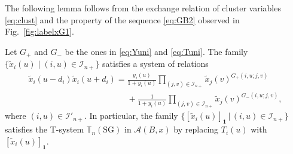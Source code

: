 The following lemma follows from the exchange relation
of
cluster variables \eqref{eq:clust}
and the property of the sequence \eqref{eq:GB2}
 observed in Fig.~\ref{fig:labelxG1}.

\begin{Lemma}
\label{lem:Gx2}
Let $G_+$ and $G_-$ be the ones in \eqref{eq:Yuni} and \eqref{eq:Tuni}.
The family $\{\tilde{x}_i(u)
\mid (i,u)\in \mathcal{I}_{n+}\}$
satisfies a system of relations
\begin{gather}
\tilde{x}_i\left(u-d_i\right)
\tilde{x}_i\left(u+d_i\right)
 =
\frac{y_i(u)}{1+y_i(u)}
\prod_{(j,v)\in \mathcal{I}_{n+}}
\tilde{x}_j(v)^{G_+(i,u;j,v)}
\nonumber\\
\phantom{\tilde{x}_i\left(u-d_i\right)
\tilde{x}_i\left(u+d_i\right)
 =}{}
+
\frac{1}{1+y_i(u)}
\prod_{(j,v)\in \mathcal{I}_{n+}}
\tilde{x}_j(v)^{G_-(i,u;j,v)},\label{eq:xy1}
\end{gather}
where $(i,u)\in \mathcal{I}'_{n+}$.
In particular,
the family $\{ [\tilde{x}_i(u)]_{\mathbf{1}}
\,|\, (i,u)\in \mathcal{I}_{n+}\}$
satisfies the T-system $\mathbb{T}_{n}(\mathrm{SG})$
in $\mathcal{A}(B,x)$
by replacing $T_i(u)$ with $[\tilde{x}_i(u)]_{\mathbf{1}}$.
\end{Lemma}

